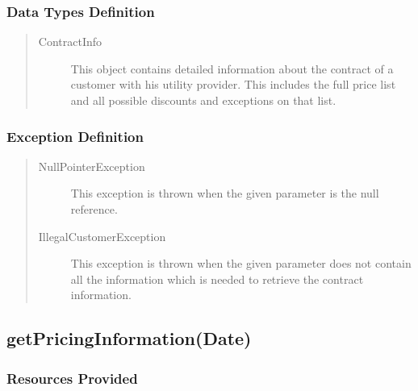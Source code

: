 \subsubsection{Data Types Definition}

\begin{quote}
	\begin{description}
		\item[ContractInfo] This object contains detailed information about the
		contract of a customer with his utility provider. This includes the full price
		list and all possible discounts and exceptions on that list.
	\end{description} 
\end{quote}

\subsubsection{Exception Definition} 

\begin{quote}
	\begin{description}
		\item[NullPointerException] This exception is thrown when the given parameter
		is the null reference.
		\item[IllegalCustomerException] This exception is thrown when the given
		parameter does not contain all the information which is needed to retrieve the
		contract information.
	\end{description} 
\end{quote}

\subsection{getPricingInformation(Date)}

\subsubsection{Resources Provided}

